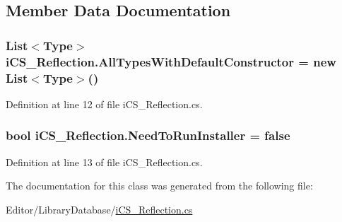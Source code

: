 \subsection{Member Data Documentation}
\hypertarget{classi_c_s___reflection_a56ed452f217e6f291258e0f689491d98}{
\subsubsection[{All\+Types\+With\+Default\+Constructor}]{\setlength{\rightskip}{0pt plus 5cm}List$<${\bf Type}$>$ i\+C\+S\+\_\+\+Reflection.\+All\+Types\+With\+Default\+Constructor = new List$<${\bf Type}$>$()\hspace{0.3cm}{\ttfamily [static]}}}\label{classi_c_s___reflection_a56ed452f217e6f291258e0f689491d98}


Definition at line 12 of file i\+C\+S\+\_\+\+Reflection.\+cs.

\hypertarget{classi_c_s___reflection_a17d9923084e2cb7775485016ced195b3}{
\subsubsection[{Need\+To\+Run\+Installer}]{\setlength{\rightskip}{0pt plus 5cm}bool i\+C\+S\+\_\+\+Reflection.\+Need\+To\+Run\+Installer = false\hspace{0.3cm}{\ttfamily [static]}}}\label{classi_c_s___reflection_a17d9923084e2cb7775485016ced195b3}


Definition at line 13 of file i\+C\+S\+\_\+\+Reflection.\+cs.



The documentation for this class was generated from the following file\+:\begin{DoxyCompactItemize}
\item 
Editor/\+Library\+Database/\hyperlink{i_c_s___reflection_8cs}{i\+C\+S\+\_\+\+Reflection.\+cs}\end{DoxyCompactItemize}
